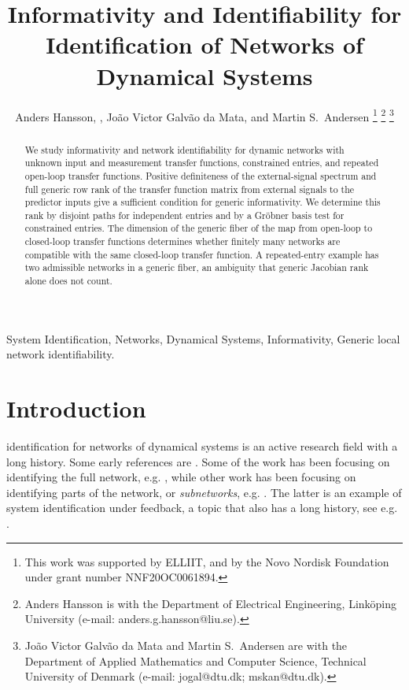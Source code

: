 \documentclass[journal,twoside,web]{ieeecolor}
\begin{document}
%
\title{Informativity and Identifiability for Identification of Networks of Dynamical Systems}
\author{Anders Hansson, , João Victor Galvão da Mata, and Martin S.~Andersen
\thanks{This work was supported by ELLIIT, and by the Novo Nordisk Foundation under grant number NNF20OC0061894.}
\thanks{Anders Hansson is with the Department of Electrical Engineering, Linköping University (e-mail: anders.g.hansson@liu.se).}
\thanks{João Victor Galvão da Mata and Martin S.~Andersen are with the Department of Applied Mathematics and Computer Science, Technical University of Denmark (e-mail: jogal@dtu.dk; mskan@dtu.dk).}}
%
\maketitle
%
\begin{abstract}
%
We study informativity and network identifiability for dynamic networks
with unknown input and measurement transfer functions, constrained entries,
and repeated open-loop transfer functions. Positive definiteness of the external-signal
spectrum and full generic row rank of the transfer function matrix from external signals to the predictor
inputs give a sufficient condition for generic informativity. We determine
this rank by disjoint paths for independent entries and by a Gröbner basis
test for constrained entries. The dimension of the generic fiber of the
map from open-loop to closed-loop transfer functions determines whether finitely many networks
are compatible with the same closed-loop transfer function. A repeated-entry
example has two
admissible networks in a generic fiber, an ambiguity that generic Jacobian
rank alone does not count.
%
\end{abstract}
%
\begin{IEEEkeywords}
System Identification, Networks, Dynamical Systems, Informativity, Generic local network identifiability.
\end{IEEEkeywords}
%
\section{Introduction}
%
 identification for networks of dynamical systems is an active research 
field with a 
long history. Some early references 
are \cite{VANDENHOF19931523,VANDENHOF20132994,hen+gev+baz19}. Some of the work has been focusing on identifying
the full network, e.g. \cite{FONKEN2022110295,hen+gev+baz19,WEERTS2018256}, while other work has been focusing on identifying parts of the network,
or {\it subnetworks}, e.g.
\cite{VANDENHOF20132994,Dankers_predictor_input,Materassi2019SignalSF,7402842,Linder03042017,9247487,9661422}.
The latter is an example of system 
identification under feedback, a topic that also has a long history, see e.g. \cite{FORSSELL19991215}.
\end{document}
